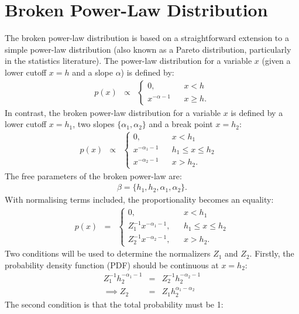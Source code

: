 \documentclass[12pt, preprint]{aastex}
\begin{document}
\section{Broken Power-Law Distribution}\label{power_law}
The broken power-law distribution is based on a straightforward extension
to a simple power-law distribution (also known as a Pareto distribution,
particularly in the statistics literature). The power-law distribution for a
variable $x$ (given a lower cutoff $x=h$ and a slope $\alpha$) is defined by:
\begin{eqnarray}
p(x) &\propto&
\left\{
\begin{array}{lcl}
0, & & x < h \\
x^{-\alpha - 1} & & x \geq h.
\end{array}
\right.
\end{eqnarray}
In contrast, the broken power-law distribution for a variable $x$ is defined by
a lower cutoff $x=h_1$, two slopes $\{\alpha_1, \alpha_2\}$ and a break point
$x=h_2$:
\begin{eqnarray}
p(x) &\propto&
\left\{
\begin{array}{lcrl}
0, & & x < h_1 & \\
x^{-\alpha_1 - 1} & & h_1 \leq x \leq h_2 & \\
x^{-\alpha_2 - 1} & & x > h_2.
\end{array}
\right.
\end{eqnarray}
The free parameters of the broken power-law are:
\begin{eqnarray}
\beta = \{h_1, h_2, \alpha_1, \alpha_2\}.
\end{eqnarray}
With normalising terms included, the proportionality becomes an equality:
\begin{eqnarray}
p(x) &=&
\left\{
\begin{array}{lcr}
0, & & x < h_1 \\
Z_1^{-1}x^{-\alpha_1 - 1}, & & h_1 \leq x \leq h_2 \\
Z_2^{-1}x^{-\alpha_2 - 1}, & & x > h_2.
\end{array}
\right.
\end{eqnarray}
Two conditions will be used to determine the normalizers $Z_1$ and $Z_2$.
Firstly, the probability density function (PDF) should be continuous at $x=h_2$:
\begin{eqnarray}
Z_1^{-1}h_2^{-\alpha_1 - 1} &=& Z_2^{-1}h_2^{-\alpha_2 - 1}\\
\implies
Z_2 &=& Z_1h_2^{\alpha_1-\alpha_2}
\end{eqnarray}
The second condition is that the total probability must be 1:
\end{document}
